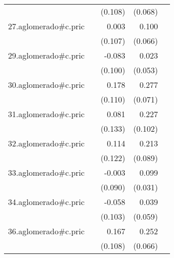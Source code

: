 {\begin{longtable}{l*{4}{D{.}{.}{-1}}}
            &                     &     (0.108)         &     (0.068)         &                     \\
\addlinespace
27.aglomerado#c.pric&                     &       0.003         &       0.100         &                     \\
            &                     &     (0.107)         &     (0.066)         &                     \\
\addlinespace
29.aglomerado#c.pric&                     &      -0.083         &       0.023         &                     \\
            &                     &     (0.100)         &     (0.053)         &                     \\
\addlinespace
30.aglomerado#c.pric&                     &       0.178         &       0.277\sym{***}&                     \\
            &                     &     (0.110)         &     (0.071)         &                     \\
\addlinespace
31.aglomerado#c.pric&                     &       0.081         &       0.227\sym{*}  &                     \\
            &                     &     (0.133)         &     (0.102)         &                     \\
\addlinespace
32.aglomerado#c.pric&                     &       0.114         &       0.213\sym{*}  &                     \\
            &                     &     (0.122)         &     (0.089)         &                     \\
\addlinespace
33.aglomerado#c.pric&                     &      -0.003         &       0.099\sym{**} &                     \\
            &                     &     (0.090)         &     (0.031)         &                     \\
\addlinespace
34.aglomerado#c.pric&                     &      -0.058         &       0.039         &                     \\
            &                     &     (0.103)         &     (0.059)         &                     \\
\addlinespace
36.aglomerado#c.pric&                     &       0.167         &       0.252\sym{***}&                     \\
            &                     &     (0.108)         &     (0.066)         &                     \\

\end{longtable}}
